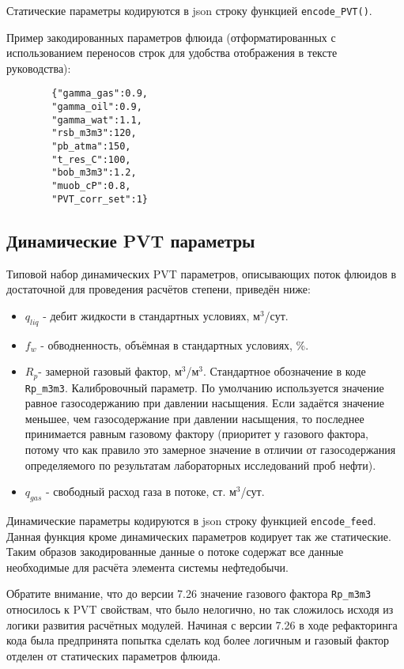 Статические параметры кодируются в json строку  функцией  \texttt{encode_PVT()}.

Пример закодированных параметров флюида (отформатированных с использованием переносов строк для удобства отображения в тексте руководства):

\begin{verbatim} 
		{"gamma_gas":0.9,
		"gamma_oil":0.9,
		"gamma_wat":1.1,
		"rsb_m3m3":120,
		"pb_atma":150,
		"t_res_C":100,
		"bob_m3m3":1.2,
		"muob_cP":0.8,
		"PVT_corr_set":1}
\end{verbatim}

\subsection{Динамические PVT параметры}
Типовой  набор динамических PVT параметров, описывающих поток флюидов в достаточной для проведения расчётов степени, приведён ниже:

\begin{itemize}
	
	\item $q_{liq}$ - дебит жидкости в стандартных условиях, м$^3$/сут.
	
	\item $f_w$ - обводненность, объёмная в стандартных условиях, \%.
	
	\item $R_p$-  замерной газовый фактор, м$^3$/м$^3$. Стандартное обозначение в коде \texttt{Rp_m3m3}. Калибровочный параметр. По умолчанию используется значение равное газосодержанию при давлении насыщения. Если задаётся значение меньшее, чем газосодержание при давлении насыщения, то последнее принимается равным газовому фактору (приоритет у газового фактора, потому что как правило это замерное значение в отличии от газосодержания определяемого по результатам лабораторных исследований проб нефти).
	
	\item $q_{gas}$ - свободный расход газа в потоке, ст. м$^3$/сут.
	
\end{itemize}

Динамические параметры кодируются в json строку  функцией  \texttt{encode_feed}. Данная функция кроме динамических параметров кодирует так же статические. Таким образов закодированные данные о потоке содержат все данные необходимые для расчёта элемента системы нефтедобычи.

Обратите внимание, что до версии 7.26 значение газового фактора \texttt{Rp_m3m3} относилось к PVT свойствам, что было нелогично, но так сложилось исходя из логики развития расчётных модулей. Начиная с версии 7.26 в ходе рефакторинга кода была предпринята попытка сделать код более логичным и газовый фактор отделен от статических параметров флюида.

